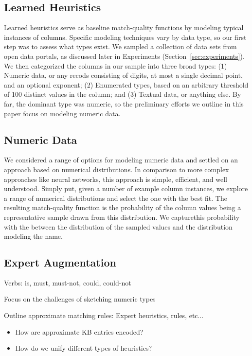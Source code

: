 \subsection{Learned Heuristics}
Learned heuristics serve as baseline match-quality functions by modeling typical instances of columns.
Specific modeling techniques vary by data type, so our first step was to assess what types exist.
We sampled a collection of \placeholder{\#\#\#} data sets from open data portals, as discussed later in Experiments (Section~\ref{sec:experiments}).
We then categorized the \placeholder{\#\#\#} columns in our sample into three broad types: 
(1) Numeric data, or any recods consisting of digits, at most a single decimal point, and an optional exponent; 
(2) Enumerated types, based on an arbitrary threshold of 100 distinct values in the column; and 
(3) Textual data, or anything else.  
By far, the dominant type was numeric, so the preliminary efforts we outline in this paper focus on modeling numeric data.

\subsection{Numeric Data}
We considered a range of options for modeling numeric data and settled on an approach based on numerical distributions.
In comparison to more complex approaches like neural networks, this approach is simple, efficient, and well understood.
Simply put, given a number of example column instances, we explore a range of numerical distributions and select the one with the best fit.
The resulting match-quality function is the probability of the column values being a representative sample drawn from this distribution.
We capturethis probability with the  between the distribution of the sampled values and the distribution modeling the name.


\subsection{Expert Augmentation}

Verbs: is, must, must-not, could, could-not


Focus on the challenges of sketching numeric types

Outline approximate matching rules: Expert heuristics, rules, etc...
\begin{itemize}
  \item How are approximate KB entries encoded?
  \item How do we unify different types of heuristics?
\end{itemize}


